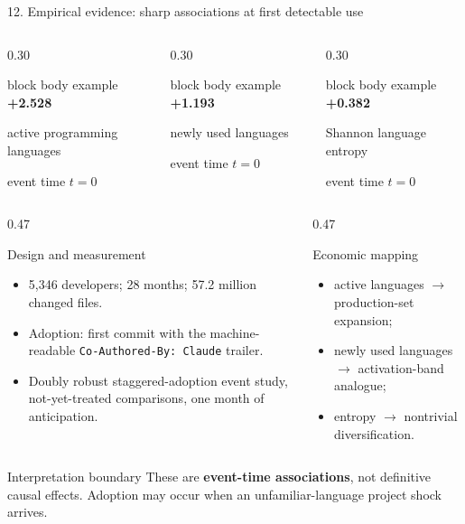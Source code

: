 \documentclass[aspectratio=169,10pt]{beamer}
\newcommand{\metric}[3]{%
  \begin{beamercolorbox}[wd=\linewidth,sep=0.11cm,center,rounded=true]{block body example}
    {\color{Teal}\Large\bfseries #1}\par
    {\scriptsize #2}\par
    {\tiny\color{Slate}#3}
  \end{beamercolorbox}%
}
\begin{document}
\begin{frame}{12. Empirical evidence: sharp associations at first detectable use}
  \vspace{-0.03cm}
  \begin{columns}[c,onlytextwidth]
    \begin{column}{0.30\textwidth}\centering
      \metric{+2.528}{active programming languages}{event time $t=0$}
    \end{column}
    \begin{column}{0.30\textwidth}\centering
      \metric{+1.193}{newly used languages}{event time $t=0$}
    \end{column}
    \begin{column}{0.30\textwidth}\centering
      \metric{+0.382}{Shannon language entropy}{event time $t=0$}
    \end{column}
  \end{columns}

  \vspace{0.18cm}
  \begin{columns}[T,onlytextwidth]
    \begin{column}{0.47\textwidth}
      \begin{block}{Design and measurement}
        \scriptsize
        \begin{itemize}
          \item 5,346 developers; 28 months; 57.2 million changed files.
          \item Adoption: first commit with the machine-readable \texttt{Co-Authored-By: Claude} trailer.
          \item Doubly robust staggered-adoption event study, not-yet-treated comparisons, one month of anticipation.
        \end{itemize}
      \end{block}
    \end{column}
    \begin{column}{0.47\textwidth}
      \begin{exampleblock}{Economic mapping}
        \scriptsize
        \begin{itemize}
          \item active languages $\rightarrow$ production-set expansion;
          \item newly used languages $\rightarrow$ activation-band analogue;
          \item entropy $\rightarrow$ nontrivial diversification.
        \end{itemize}
      \end{exampleblock}
    \end{column}
  \end{columns}

  \begin{alertblock}{Interpretation boundary}
    \scriptsize These are \textbf{event-time associations}, not definitive causal effects. Adoption may occur when an unfamiliar-language project shock arrives.
  \end{alertblock}
\end{frame}
\end{document}
